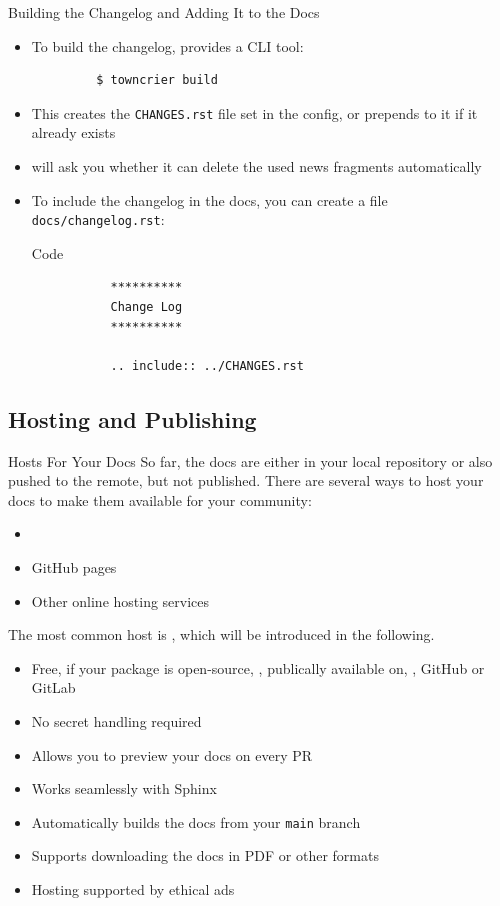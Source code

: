 \begin{frame}[fragile]{Building the Changelog and Adding It to the Docs}
  \begin{itemize}
    \setlength{\itemsep}{1em}
    \item To build the changelog, \tc{} provides a CLI tool:
      \begin{verbatim}
         $ towncrier build
      \end{verbatim}
    \item This creates the \texttt{CHANGES.rst} file set in the config, or prepends to it
      if it already exists
    \item \tc{} will ask you whether it can delete the used news fragments automatically
    \item To include the changelog in the docs, you can create a file \texttt{docs/changelog.rst}:
      \begin{block}{Code}
        \begin{verbatim}
           **********
           Change Log
           **********

           .. include:: ../CHANGES.rst
         \end{verbatim}
      \end{block}
  \end{itemize}
\end{frame}

\subsection{Hosting and Publishing}
\begin{frame}[fragile]{Hosts For Your Docs}
   So far, the docs are either in your local repository or also pushed to the remote,
   but not published. There are several ways to host your docs to make them available
   for your community:
   \begin{itemize}
    \item \rtd
    \item GitHub pages
    \item Other online hosting services
   \end{itemize}

   The most common host is \rtd, which will be introduced in the following.
\end{frame}
\begin{frame}[fragile]{\rtd}
  \begin{itemize}
    \setlength{\itemsep}{1.5em}
    \item Free, if your package is open-source, \ie, publically available on, \eg, GitHub or GitLab
    \item No secret handling required
    \item Allows you to preview your docs on every PR
    \item Works seamlessly with Sphinx
    \item Automatically builds the docs from your \texttt{main} branch
    \item Supports downloading the docs in PDF or other formats
    \item Hosting supported by ethical ads
  \end{itemize}
\end{frame}

